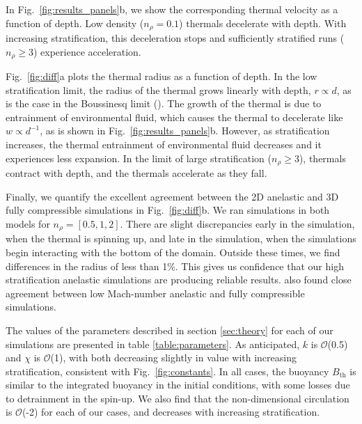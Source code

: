\documentclass[twocolumn, amsmath, amsfonts, amssymb, trackchanges]{aastex62}
\newcommand{\LJ}{\citetalias{lecoanet&jeevanjee2018}}
\begin{document}
In Fig.~\ref{fig:results_panels}b, we show the corresponding thermal velocity as a function of depth.
Low density ($n_\rho = 0.1$) thermals decelerate with depth.
With increasing stratification, this deceleration stops and sufficiently stratified runs ($n_\rho \geq 3$) experience acceleration.

Fig.~\ref{fig:diff}a plots the thermal radius as a function of depth.
In the low stratification limit, the radius of the thermal grows linearly with depth, $r \propto d$, as is the case in the Boussinesq limit (\LJ).
The growth of the thermal is due to entrainment of environmental fluid, which causes the thermal to decelerate like $w \propto d^{-1}$, as is shown in Fig.~\ref{fig:results_panels}b.
However, as stratification increases, the thermal entrainment of environmental fluid decreases and it experiences less expansion.
In the limit of large stratification ($n_\rho \geq 3$), thermals contract with depth, and the thermals accelerate as they fall.

Finally, we quantify the excellent agreement between the 2D anelastic and 3D fully compressible simulations in Fig.~\ref{fig:diff}b.
We ran simulations in both models for $n_\rho = [0.5, 1, 2]$.
There are slight discrepancies early in the simulation, when the thermal is spinning up, and late in the simulation, when the simulations begin interacting with the bottom of the domain.
Outside these times, we find differences in the radius of less than 1\%.
This gives us confidence that our high stratification anelastic simulations are producing reliable results.
\citet{lecoanet&all2014} also found close agreement between low Mach-number anelastic and fully compressible simulations.

The values of the parameters described in section \ref{sec:theory} for each of our simulations are presented in table \ref{table:parameters}.
As anticipated, $k$ is $\mathcal{O}$(0.5) and $\chi$ is $\mathcal{O}$(1), with both decreasing slightly in value with increasing stratification, consistent with Fig.~\ref{fig:constants}.
In all cases, the buoyancy $B_{\text{th}}$ is similar to the integrated buoyancy in the initial conditions, with some losses due to detrainment in the spin-up.
We also find that the non-dimensional circulation is $\mathcal{O}$(-2) for each of our cases, and decreases with increasing stratification.
\end{document}
